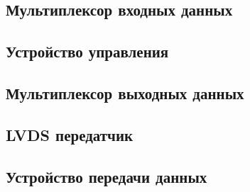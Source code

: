 

\subsection*{Мультиплексор входных данных}



\subsection*{Устройство управления}



\subsection*{Мультиплексор выходных данных}



\newpage

\subsection*{LVDS передатчик}



\subsection*{Устройство передачи данных}




